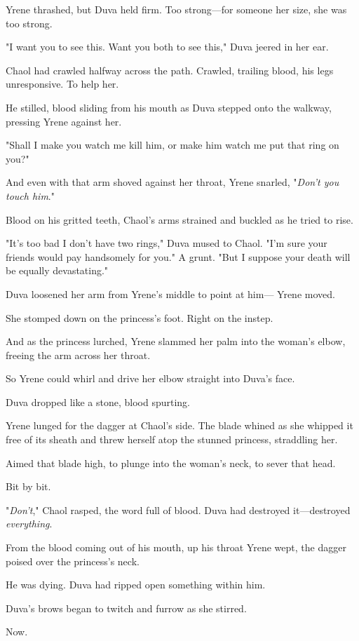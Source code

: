 Yrene thrashed, but Duva held firm. Too strong---for someone her size, she was too strong.

"I want you to see this. Want you both to see this," Duva jeered in her ear.

Chaol had crawled halfway across the path. Crawled, trailing blood, his legs unresponsive. To help her.

He stilled, blood sliding from his mouth as Duva stepped onto the walkway, pressing Yrene against her.

"Shall I make you watch me kill him, or make him watch me put that ring on you?"

And even with that arm shoved against her throat, Yrene snarled, "\emph{Don't you touch him}."

Blood on his gritted teeth, Chaol's arms strained and buckled as he tried to rise.

"It's too bad I don't have two rings," Duva mused to Chaol. "I'm sure your friends would pay handsomely for you." A grunt. "But I suppose your death will be equally devastating."

Duva loosened her arm from Yrene's middle to point at him--- Yrene moved.

She stomped down on the princess's foot. Right on the instep.

And as the princess lurched, Yrene slammed her palm into the woman's elbow, freeing the arm across her throat.

So Yrene could whirl and drive her elbow straight into Duva's face.

Duva dropped like a stone, blood spurting.

Yrene lunged for the dagger at Chaol's side. The blade whined as she whipped it free of its sheath and threw herself atop the stunned princess, straddling her.

Aimed that blade high, to plunge into the woman's neck, to sever that head.

Bit by bit.

"\emph{Don't}," Chaol rasped, the word full of blood. Duva had destroyed it---destroyed \emph{everything}.

From the blood coming out of his mouth, up his throat  Yrene wept, the dagger poised over the princess's neck.

He was dying. Duva had ripped open something within him.

Duva's brows began to twitch and furrow as she stirred.

Now.

